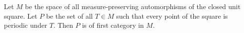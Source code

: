 Let $M$ be the space of all measure-preserving automorphisms of the closed unit square. Let $P$ be the set of all $T \in M$ such that every point of the square is periodic under $T$. Then $P$ is of first category in $M$.
